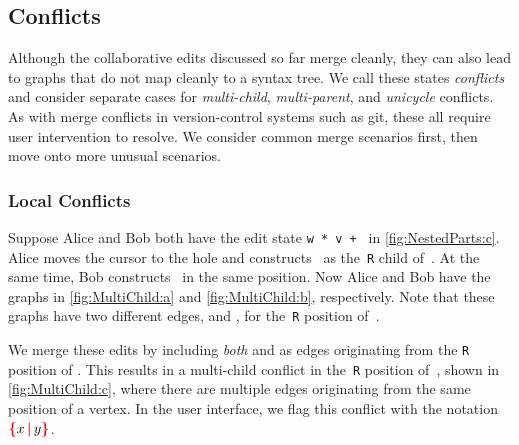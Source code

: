 \subsection{Conflicts}%
\label{sub:Merge Conflicts}

Although the collaborative edits discussed so far merge cleanly,
they can also lead to graphs that do not map cleanly to a syntax tree.
We call these states \emph{conflicts}
and consider separate cases for \emph{multi-child}, \emph{multi-parent}, and \emph{unicycle} conflicts.
As with merge conflicts in version-control systems such as git, these all require user intervention to resolve.
We consider common merge scenarios first, then move onto more unusual scenarios.
 
\subsubsection{Local Conflicts}%
\label{sub:Multi-child conflicts}

\figureMultiChild

Suppose Alice and Bob both have the edit state \texttt{w * v + \hole} in \autoref{fig:NestedParts:c}.
Alice moves the cursor to the hole and constructs~\vMultiChildAlice{} as the~\texttt{R} child of~\vWrapPlus{}.
At the same time, Bob constructs~\vMultiChildBob{} in the same position.
Now Alice and Bob have the graphs in \autoref{fig:MultiChild:a} and \autoref{fig:MultiChild:b}, respectively.
Note that these graphs have two different edges,
\eMultiChildAlice{} and \eMultiChildBob{}, for the~\texttt{R} position of~\vWrapPlus{}.

We merge these edits by including \emph{both} \eMultiChildAlice{} and \eMultiChildBob{}
as edges originating from the \texttt{R} position of \vWrapPlus{}.
This results in a multi-child conflict in the~\texttt{R} position of~\vWrapPlus,
shown in \autoref{fig:MultiChild:c},
where there are multiple edges originating from the same position of a vertex.
In the user interface, we flag this conflict with the notation~$\conflictHole{x,y}$.


